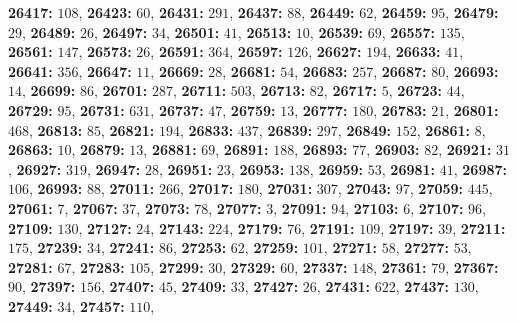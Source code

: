 \textsf{\bfseries 26417:} $108$, \textsf{\bfseries 26423:} $60$, \textsf{\bfseries 26431:} $291$, \textsf{\bfseries 26437:} $88$, \textsf{\bfseries 26449:} $62$, \textsf{\bfseries 26459:} $95$, \textsf{\bfseries 26479:} $29$, \textsf{\bfseries 26489:} $26$, \textsf{\bfseries 26497:} $34$, \textsf{\bfseries 26501:} $41$, \textsf{\bfseries 26513:} $10$, \textsf{\bfseries 26539:} $69$, \textsf{\bfseries 26557:} $135$, \textsf{\bfseries 26561:} $147$, \textsf{\bfseries 26573:} $26$, \textsf{\bfseries 26591:} $364$, \textsf{\bfseries 26597:} $126$, \textsf{\bfseries 26627:} $194$, \textsf{\bfseries 26633:} $41$, \textsf{\bfseries 26641:} $356$, \textsf{\bfseries 26647:} $11$, \textsf{\bfseries 26669:} $28$, \textsf{\bfseries 26681:} $54$, \textsf{\bfseries 26683:} $257$, \textsf{\bfseries 26687:} $80$, \textsf{\bfseries 26693:} $14$, \textsf{\bfseries 26699:} $86$, \textsf{\bfseries 26701:} $287$, \textsf{\bfseries 26711:} $503$, \textsf{\bfseries 26713:} $82$, \textsf{\bfseries 26717:} $5$, \textsf{\bfseries 26723:} $44$, \textsf{\bfseries 26729:} $95$, \textsf{\bfseries 26731:} $631$, \textsf{\bfseries 26737:} $47$, \textsf{\bfseries 26759:} $13$, \textsf{\bfseries 26777:} $180$, \textsf{\bfseries 26783:} $21$, \textsf{\bfseries 26801:} $468$, \textsf{\bfseries 26813:} $85$, \textsf{\bfseries 26821:} $194$, \textsf{\bfseries 26833:} $437$, \textsf{\bfseries 26839:} $297$, \textsf{\bfseries 26849:} $152$, \textsf{\bfseries 26861:} $8$, \textsf{\bfseries 26863:} $10$, \textsf{\bfseries 26879:} $13$, \textsf{\bfseries 26881:} $69$, \textsf{\bfseries 26891:} $188$, \textsf{\bfseries 26893:} $77$, \textsf{\bfseries 26903:} $82$, \textsf{\bfseries 26921:} $31$, \textsf{\bfseries 26927:} $319$, \textsf{\bfseries 26947:} $28$, \textsf{\bfseries 26951:} $23$, \textsf{\bfseries 26953:} $138$, \textsf{\bfseries 26959:} $53$, \textsf{\bfseries 26981:} $41$, \textsf{\bfseries 26987:} $106$, \textsf{\bfseries 26993:} $88$, \textsf{\bfseries 27011:} $266$, \textsf{\bfseries 27017:} $180$, \textsf{\bfseries 27031:} $307$, \textsf{\bfseries 27043:} $97$, \textsf{\bfseries 27059:} $445$, \textsf{\bfseries 27061:} $7$, \textsf{\bfseries 27067:} $37$, \textsf{\bfseries 27073:} $78$, \textsf{\bfseries 27077:} $3$, \textsf{\bfseries 27091:} $94$, \textsf{\bfseries 27103:} $6$, \textsf{\bfseries 27107:} $96$, \textsf{\bfseries 27109:} $130$, \textsf{\bfseries 27127:} $24$, \textsf{\bfseries 27143:} $224$, \textsf{\bfseries 27179:} $76$, \textsf{\bfseries 27191:} $109$, \textsf{\bfseries 27197:} $39$, \textsf{\bfseries 27211:} $175$, \textsf{\bfseries 27239:} $34$, \textsf{\bfseries 27241:} $86$, \textsf{\bfseries 27253:} $62$, \textsf{\bfseries 27259:} $101$, \textsf{\bfseries 27271:} $58$, \textsf{\bfseries 27277:} $53$, \textsf{\bfseries 27281:} $67$, \textsf{\bfseries 27283:} $105$, \textsf{\bfseries 27299:} $30$, \textsf{\bfseries 27329:} $60$, \textsf{\bfseries 27337:} $148$, \textsf{\bfseries 27361:} $79$, \textsf{\bfseries 27367:} $90$, \textsf{\bfseries 27397:} $156$, \textsf{\bfseries 27407:} $45$, \textsf{\bfseries 27409:} $33$, \textsf{\bfseries 27427:} $26$, \textsf{\bfseries 27431:} $622$, \textsf{\bfseries 27437:} $130$, \textsf{\bfseries 27449:} $34$, \textsf{\bfseries 27457:} $110$, 
